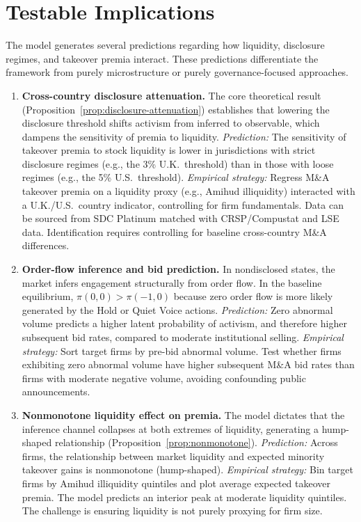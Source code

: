 \documentclass[11pt]{article}
\newcommand{\1}{\mathbf{1}}
\begin{document}
\section{Testable Implications}
\label{sec:testable}
\label{sec:testable_implications}

The model generates several predictions regarding how liquidity, disclosure regimes, and takeover premia interact. These predictions differentiate the framework from purely microstructure or purely governance-focused approaches.

\begin{enumerate}[label=\textbf{\arabic*.}]
    \item \textbf{Cross-country disclosure attenuation.} The core theoretical result (Proposition~\ref{prop:disclosure-attenuation}) establishes that lowering the disclosure threshold shifts activism from inferred to observable, which dampens the sensitivity of premia to liquidity.
    \emph{Prediction:} The sensitivity of takeover premia to stock liquidity is lower in jurisdictions with strict disclosure regimes (e.g., the 3\% U.K.\ threshold) than in those with loose regimes (e.g., the 5\% U.S.\ threshold).
    \emph{Empirical strategy:} Regress M\&A takeover premia on a liquidity proxy (e.g., Amihud illiquidity) interacted with a U.K./U.S.\ country indicator, controlling for firm fundamentals. Data can be sourced from SDC Platinum matched with CRSP/Compustat and LSE data. Identification requires controlling for baseline cross-country M\&A differences.

    \item \textbf{Order-flow inference and bid prediction.} In nondisclosed states, the market infers engagement structurally from order flow. In the baseline equilibrium, $\pi(0,0) > \pi(-1,0)$ because zero order flow is more likely generated by the Hold or Quiet Voice actions.
    \emph{Prediction:} Zero abnormal volume predicts a higher latent probability of activism, and therefore higher subsequent bid rates, compared to moderate institutional selling.
    \emph{Empirical strategy:} Sort target firms by pre-bid abnormal volume. Test whether firms exhibiting zero abnormal volume have higher subsequent M\&A bid rates than firms with moderate negative volume, avoiding confounding public announcements.

    \item \textbf{Nonmonotone liquidity effect on premia.} The model dictates that the inference channel collapses at both extremes of liquidity, generating a hump-shaped relationship (Proposition~\ref{prop:nonmonotone}).
    \emph{Prediction:} Across firms, the relationship between market liquidity and expected minority takeover gains is nonmonotone (hump-shaped).
    \emph{Empirical strategy:} Bin target firms by Amihud illiquidity quintiles and plot average expected takeover premia. The model predicts an interior peak at moderate liquidity quintiles. The challenge is ensuring liquidity is not purely proxying for firm size.


\end{enumerate}
\end{document}
